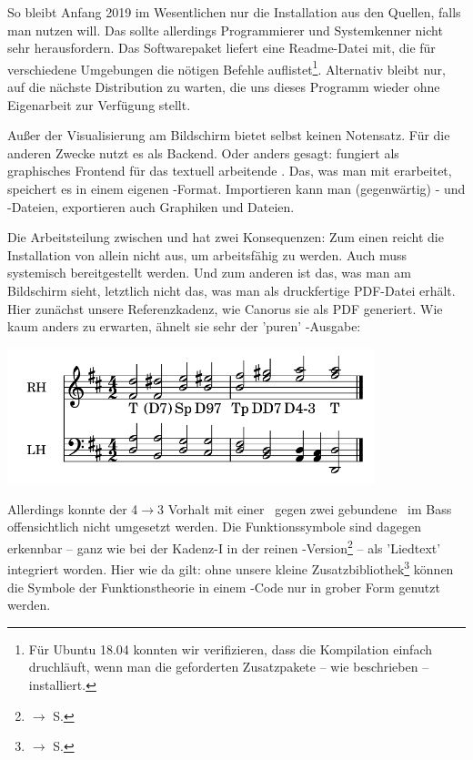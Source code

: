So bleibt Anfang 2019 im Wesentlichen nur die Installation aus den Quellen,
falls man  nutzen will. Das sollte allerdings Programmierer und
Systemkenner nicht sehr herausfordern. Das Softwarepaket liefert eine
Readme-Datei mit, die für verschiedene Umgebungen die nötigen Befehle
auflistet\footnote{Für Ubuntu 18.04 konnten wir verifizieren, dass die
Kompilation einfach druchläuft, wenn man die geforderten Zusatzpakete -- wie
beschrieben -- installiert.}. Alternativ bleibt nur, auf die nächste
Distribution zu warten, die uns dieses Programm wieder ohne Eigenarbeit zur
Verfügung stellt.

Außer der Visualisierung am Bildschirm bietet  selbst keinen
Notensatz. Für die anderen Zwecke nutzt es  als Backend. Oder
anders gesagt:  fungiert als graphisches Frontend für das textuell
arbeitende . Das, was man mit  erarbeitet, speichert
es in einem eigenen -Format. Importieren kann man (gegenwärtig) 
- und -Dateien, exportieren auch Graphiken und
Dateien.

Die Arbeitsteilung zwischen  und  hat zwei
Konsequenzen: Zum einen reicht die Installation von  allein nicht
aus, um arbeitsfähig zu werden. Auch   muss systemisch
bereitgestellt werden. Und zum anderen ist das, was man am Bildschirm sieht,
letztlich nicht das, was man als druckfertige PDF-Datei erhält. Hier zunächst
unsere Referenzkadenz, wie Canorus sie als PDF generiert. Wie kaum anders zu
erwarten, ähnelt sie sehr der 'puren' -Ausgabe:

\begin{center}
\includegraphics[width=0.8\textwidth]{frontends/canorus/cadenca2-pdf.png}
\end{center}

Allerdings konnte der 4$\rightarrow$3 Vorhalt mit einer \Halb\ gegen zwei
gebundene \Vier\ im Bass offensichtlich nicht umgesetzt werden. Die
Funktionssymbole sind dagegen erkennbar -- ganz wie bei der Kadenz-I in der
reinen -Version\footnote{$\rightarrow$ S.
\pageref{LilyPondKadenzI}} -- als 'Liedtext' integriert worden. Hier wie da
gilt: ohne unsere kleine Zusatzbibliothek\footnote{$\rightarrow$ S.
\pageref{LilyPondFuncTheory}} können die Symbole der Funktionstheorie in einem
-Code nur in grober Form genutzt werden.


